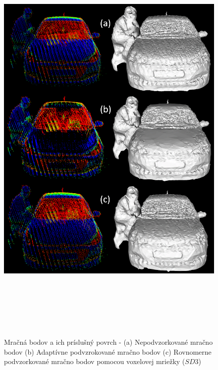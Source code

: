 \newpage\vfill
\begin{figure}[!htbp]
  \centering
  \includegraphics[width=16cm, height=21cm]{img/adaptive_comparison2.png}
  \caption{Mračná bodov a ich príslušný povrch - (a) Nepodvzorkované mračno bodov (b) Adaptívne podvzrokované mračno bodov (c) Rovnomerne podvzorkované mračno bodov pomocou voxelovej mriežky ($SD3$)} 
  \label{fig:adaptive_comparison2}
\end{figure}
\vfill\clearpage 

